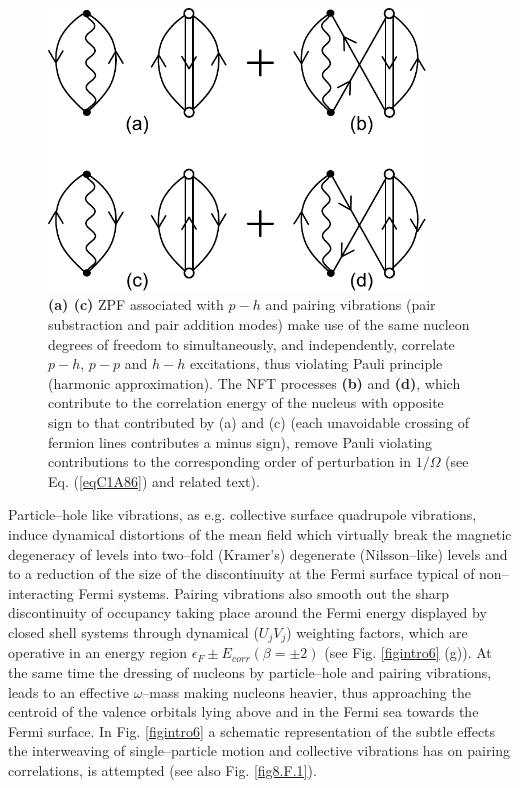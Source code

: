 \begin{figure}
\centerline {
\includegraphics*[width=10cm]{introduccion/figs/figintroF2}
}
\caption{\textbf{(a) (c)} ZPF associated with $p-h$ and pairing vibrations (pair substraction and pair addition modes) make use of the same nucleon degrees of freedom to simultaneously, and independently, correlate  $p-h$, $p-p$ and $h-h$ excitations, thus violating Pauli principle (harmonic approximation). The NFT processes \textbf{(b)} and \textbf{(d)}, which contribute to the correlation energy of the nucleus with opposite sign to that contributed by (a) and (c) (each unavoidable crossing of fermion lines contributes  a minus sign), remove Pauli violating contributions to the corresponding order of perturbation in $1/\Omega$ (see Eq. (\ref{eqC1A86}) and related text).}
\label{figintroF2}
\end{figure}
Particle--hole like vibrations, as e.g. collective surface quadrupole vibrations, induce dynamical distortions of the mean field which virtually break the  magnetic degeneracy of levels into two--fold (Kramer's) degenerate (Nilsson--like) levels and to a reduction of the size of the discontinuity at the Fermi surface typical of non--interacting Fermi systems. Pairing vibrations also smooth out the sharp discontinuity of occupancy taking place around the Fermi energy  displayed by closed shell systems through dynamical ($U_jV_j$) weighting factors, which are operative in an energy region  $\epsilon_F\pm E_{corr}(\beta=\pm2)$ (see Fig. \ref{figintro6} (g)). At the same time the dressing of nucleons by particle--hole and pairing vibrations, leads to an effective $\omega$--mass making nucleons heavier, thus approaching the centroid of the valence orbitals lying above and in the Fermi sea towards the Fermi surface.  In Fig. \ref{figintro6} a schematic representation of the subtle effects the interweaving of single--particle motion and collective vibrations has on pairing correlations, is attempted (see also Fig. \ref{fig8.F.1}). 





